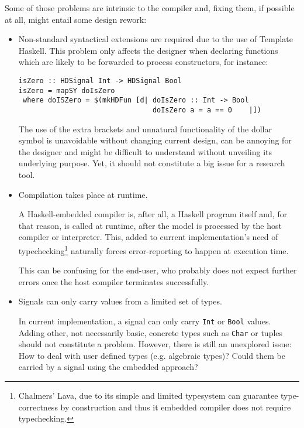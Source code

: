 \documentclass[a4paper,twoside,11pt]{article}
\begin{document}
Some of those problems are intrinsic to the compiler and, fixing them, if
possible at all, might entail some design rework:

\begin{itemize}
\item Non-standard syntactical extensions are required due to the use of
  Template Haskell. This problem only affects the designer when declaring
  functions which are likely to be forwarded to process constructors, for
  instance:

\begin{verbatim}
isZero :: HDSignal Int -> HDSignal Bool
isZero = mapSY doIsZero
 where doISZero = $(mkHDFun [d| doIsZero :: Int -> Bool
                                doIsZero a = a == 0    |])
\end{verbatim}

  The use of the extra brackets and unnatural functionality of the dollar
  symbol is unavoidable without changing current design, can be annoying for
  the designer and might be difficult to understand without unveiling its
  underlying purpose. Yet, it should not constitute a big issue for a research
  tool.

\item Compilation takes place at runtime.

  A Haskell-embedded compiler is, after all, a Haskell program itself and, for
  that reason, is called at runtime, after the model is processed by the host
  compiler or interpreter. This, added to current implementation's need of
  typechecking\footnote{Chalmers' Lava, due to its simple and limited typesystem
    can guarantee type-correctness by construction and thus it embedded
    compiler does not require typechecking.}  naturally forces error-reporting
  to happen at execution time.

  This can be confusing for the end-user, who probably does not expect further
  errors once the host compiler terminates successfully.

\item Signals can only carry values from a limited set of types.

  In current implementation, a signal can only carry \texttt{Int} or
  \texttt{Bool} values. Adding other, not necessarily basic, concrete types
  such as \texttt{Char} or tuples should not constitute a problem. However,
  there is still an unexplored issue: How to deal with user defined types
  (e.g. algebraic types)? Could them be carried by a signal using the
  embedded approach?
  

\end{itemize}
\end{document}
